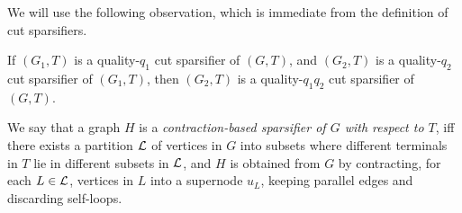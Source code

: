 We will use the following observation, which is immediate from the definition of cut sparsifiers.
\begin{observation}
\label{obs: chain}
If $(G_1,T)$ is a quality-$q_1$ cut sparsifier of $(G,T)$, and $(G_2,T)$ is a quality-$q_2$ cut sparsifier of $(G_1,T)$, then $(G_2,T)$ is a quality-$q_1q_2$ cut sparsifier of $(G,T)$.
\end{observation}

We say that a graph $H$ is a \emph{contraction-based sparsifier of $G$ with respect to $T$}, iff there exists a partition ${\mathcal{L}}$ of vertices in $G$ into subsets where different terminals in $T$ lie in different subsets in ${\mathcal{L}}$, and $H$ is obtained from $G$ by contracting, for each $L\in{\mathcal{L}}$, vertices in $L$ into a supernode $u_L$, keeping parallel edges and discarding self-loops. %

